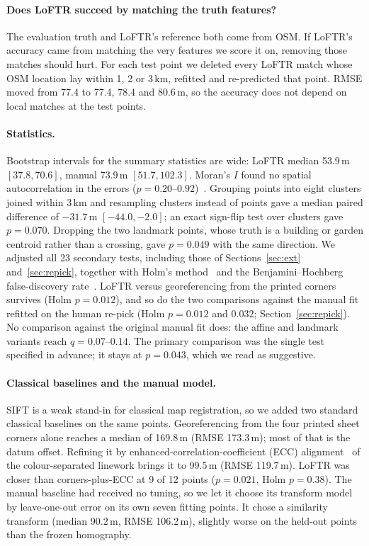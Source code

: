 \documentclass[10pt,twocolumn]{article}
\newcommand{\metre}{\,m}
\begin{document}
\paragraph{Does LoFTR succeed by matching the truth features?}
The evaluation truth and LoFTR's reference both come from OSM. If LoFTR's accuracy came from matching the very features we score it on, removing those matches should hurt. For each test point we deleted every LoFTR match whose OSM location lay within 1, 2 or 3\,km, refitted and re-predicted that point. RMSE moved from 77.4 to 77.4, 78.4 and 80.6\metre, so the accuracy does not depend on local matches at the test points.

\paragraph{Statistics.}
Bootstrap intervals for the summary statistics are wide: LoFTR median 53.9\metre{} $[37.8, 70.6]$, manual 73.9\metre{} $[51.7, 102.3]$. Moran's $I$ found no spatial autocorrelation in the errors ($p=0.20$--$0.92$)~\citep{moran1950}. Grouping points into eight clusters joined within 3\,km and resampling clusters instead of points gave a median paired difference of $-31.7$\metre{} $[-44.0, -2.0]$; an exact sign-flip test over clusters gave $p=0.070$. Dropping the two landmark points, whose truth is a building or garden centroid rather than a crossing, gave $p=0.049$ with the same direction. We adjusted all 23 secondary tests, including those of Sections~\ref{sec:ext} and~\ref{sec:repick}, together with Holm's method~\citep{holm1979} and the Benjamini--Hochberg false-discovery rate~\citep{benjamini1995}. LoFTR versus georeferencing from the printed corners survives (Holm $p=0.012$), and so do the two comparisons against the manual fit refitted on the human re-pick (Holm $p=0.012$ and $0.032$; Section~\ref{sec:repick}). No comparison against the original manual fit does: the affine and landmark variants reach $q=0.07$--$0.14$. The primary comparison was the single test specified in advance; it stays at $p=0.043$, which we read as suggestive.

\paragraph{Classical baselines and the manual model.}
SIFT is a weak stand-in for classical map registration, so we added two standard classical baselines on the same points. Georeferencing from the four printed sheet corners alone reaches a median of 169.8\metre{} (RMSE 173.3\metre); most of that is the datum offset. Refining it by enhanced-correlation-coefficient (ECC) alignment~\citep{evangelidis2008} of the colour-separated linework brings it to 99.5\metre{} (RMSE 119.7\metre). LoFTR was closer than corners-plus-ECC at 9 of 12 points ($p=0.021$, Holm $p=0.38$). The manual baseline had received no tuning, so we let it choose its transform model by leave-one-out error on its own seven fitting points. It chose a similarity transform (median 90.2\metre, RMSE 106.2\metre), slightly worse on the held-out points than the frozen homography.
\end{document}
